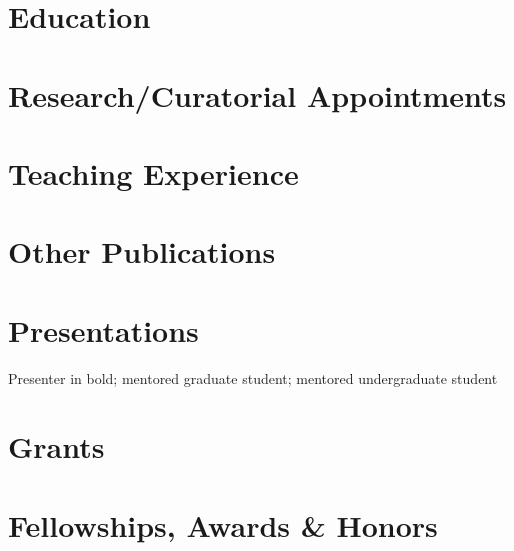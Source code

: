 


\newcommand{\longcontent}[1]{#1}

\newcommand{\oldcontent}[1]{}

\newcommand{\docTitle}{Curriculum Vitae\xspace}


\singlespacing



\section*{Education}


\section*{Research/Curatorial Appointments}


\longcontent{
\section*{Teaching Experience}

}

\nocite{*}
\printbibliography[keyword=OaksPeerReviewed, keyword=OaksCVPreprint]

\longcontent{
\section*{Other Publications}

}

\longcontent{
\section*{Presentations}
Presenter in bold; \gradadvisee{}mentored graduate student;
\undergradadvisee{}mentored undergraduate student


}

\section*{Grants}


\section*{Fellowships, Awards \& Honors}


